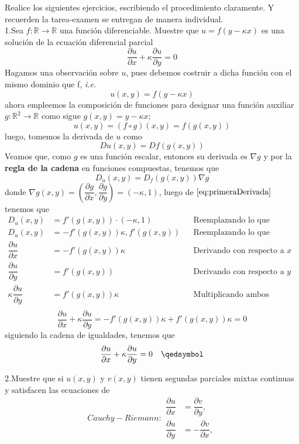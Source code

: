 \documentclass[letterpaper]{article}
\renewcommand{\d}{\partial}
\newcommand{\R}{\mathds{R}}
\renewcommand{\*}{\cdot}
\theoremstyle{definition}
\begin{document}
	\noindent Realice los siguientes ejercicios, escribiendo el procedimiento claramente. Y recuerden la tarea-examen se entregan de manera individual.\\
	
\noindent1.Sea $f: \mathbb{R} \longrightarrow \mathbb{R}$ una función diferenciable. Muestre que $u = f(y - \kappa x)$ es una solución de la ecuación diferencial parcial $$\dfrac{\partial u}{\partial x} + \kappa\dfrac{\partial u}{\partial y} = 0$$
Hagamos una observación sobre $ u $, pues debemos costruir a dicha función con el mismo dominio que f, \textit{i.e. }
\[ u(x,y) = f(y-\kappa x)  \]ahora empleemos la composición de funciones para designar una función auxiliar $ g: \R^2 \to \R $  como sigue $ g(x,y) = y-\kappa x $;
\[ u(x,y) = (f \circ g)(x,y) = f(g(x,y)) \]
luego, tomemos la derivada de $ u $ como 
\[ Du(x,y) = Df(g(x,y)) \]Veamos que, como $ g $ es una función escalar, entonces su derivada es $ \nabla g $ y por la \textbf{regla de la cadena }en funciones compuestas, tenemos que \[ D_u (x,y) = D_f(g(x,y))\nabla g \label{eq:primeraDerivada}\tag{\venus} \]donde $ \nabla g(x,y) = \left( \dfrac{\d g}{\d x}, \dfrac{\d g}{\d y} \right)= \left( -\kappa, 1 \right) $, luego de $ \ref{eq:primeraDerivada} $ tenemos que 
\begin{align*}
	D_u (x,y) &= f'(g(x,y)) \* \left( -\kappa, 1 \right)  && \text{Reemplazando lo que sabemos del gradiente}\\
	D_u (x,y) &= -f'(g(x,y))\kappa, f'(g(x,y)) && \text{Reemplazando lo que sabemos del gradiente}\\
	\dfrac{\d u}{\d x} &= -f'(g(x,y))\kappa  && \text{Derivando con respecto a }x\\
	\dfrac{\d u}{\d y} &= f'(g(x,y)) && \text{Derivando con respecto a }y\\
	\kappa\dfrac{\d u}{\d y} &= f'(g(x,y))\kappa  && \text{Multiplicando ambos miembros por el mismo real }\\
\end{align*}
\[ \dfrac{\partial u}{\partial x} + \kappa\dfrac{\partial u}{\partial y} = -f'(g(x,y))\kappa + f'(g(x,y))\kappa = 0  \]siguiendo la cadena de igualdades, tenemos que 
\[ \dfrac{\partial u}{\partial x} + \kappa\dfrac{\partial u}{\partial y} = 0 \quad \qedsymbol \]

\noindent2.Muestre que si  $u(x,y)$ y $v(x,y)$ tienen segundas parciales mixtas continuas y satisfacen las ecuaciones de 
\begin{subequations}
\label{eq:Maxwell}
Cauchy-Riemann:
\begin{align}
        \dfrac{\partial u}{\partial x} &= \dfrac{\partial v}{\partial y},         \label{eq:MaxB} \\
        \dfrac{\partial u}{\partial y} &= - \dfrac{\partial v}{\partial x}, \label{eq:MaxE}
\end{align}
\end{subequations}
\end{document}
